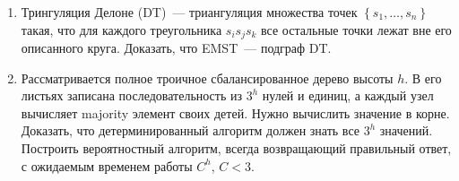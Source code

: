 \documentclass[a4paper,11pt]{article}
\begin{document}
\begin{enumerate}
	\item Трингуляция Делоне (DT)~— триангуляция множества точек \(\left\{ s_1, \ldots, s_n \right\}\) такая, что для каждого треугольника \( s_i s_j s_k \) все остальные точки лежат вне его описанного круга. Доказать, что EMST~— подграф DT.

	\item Рассматривается полное троичное сбалансированное дерево высоты \(h\). В его листьях записана последовательность из \(3^h\) нулей и единиц, а каждый узел вычисляет majority элемент своих детей. Нужно вычислить значение в корне. Доказать, что детерминированный алгоритм должен знать все \(3^h\) значений. Построить вероятностный алгоритм, всегда возвращающий правильный ответ, с ожидаемым временем работы \(C^h\), \(C < 3\).

\end{enumerate}
	
\end{document}
